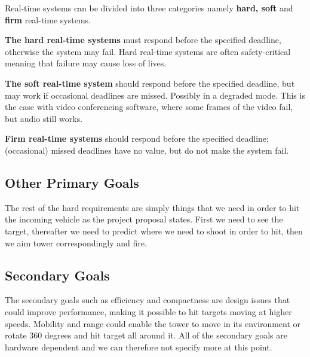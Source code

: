 Real-time systems can be divided into three categories namely \textbf{hard, soft} and \textbf{firm} real-time systems.

\textbf{The hard real-time systems} must respond before the specified deadline, otherwise the system may fail. Hard real-time systems are often safety-critical meaning that failure may cause loss of lives.

\textbf{The soft real-time system} should respond before the specified deadline, but may work if occasional deadlines are missed. Possibly in a degraded mode. This is the case with video conferencing software, where some frames of the video fail, but audio still works. 

\textbf{Firm real-time systems} should respond before the specified deadline; (occasional) missed deadlines have no value, but do not make the system fail.

\subsection{Other Primary Goals} %
\label{sub:other_primary_goals}
The rest of the hard requirements are simply things that we need in order to hit the incoming vehicle as the project proposal states. First we need to see the target, thereafter we need to predict where we need to shoot in order to hit, then we aim tower correspondingly and fire. 

\subsection{Secondary Goals} %
\label{sub:secondary_goals}
The secondary goals such as efficiency and compactness are design issues that could improve performance, making it possible to hit targets moving at higher speeds. Mobility and range could enable the tower to move in its environment or rotate 360 degrees and hit target all around it. All of the secondary goals are hardware dependent and we can therefore not specify more at this point.

